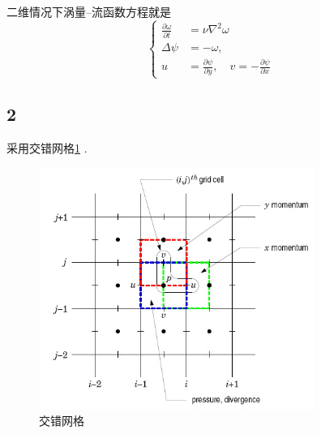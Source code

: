 \documentclass[12pt]{article}
\begin{document}
二维情况下涡量–流函数方程就是
\begin{equation}
	\left\{\begin{aligned}
		\frac{\partial \omega}{\partial t} & = \nu \nabla^{2} \omega                                                        \\
		\Delta \psi                        & =-\omega,                                                                      \\
		u                                  & =\frac{\partial \psi}{\partial y}, \quad v  =-\frac{\partial \psi}{\partial x}
	\end{aligned}\right.
\end{equation}

\subsection{2}

采用交错网格\cref{fig:C2jiao} .
\begin{figure}[htp]
	\centering
	\includegraphics[width=9cm]{jiaocuo.png}
	\caption{交错网格}
	\label{fig:C2jiao}
\end{figure}
\end{document}
